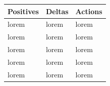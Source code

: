 \documentclass[10pt, onecolumn, draftclsnofoot, letterpaper, compsoc]{IEEEtran}
\begin{document}
\begin{table}[h]
    \centering
    \begin{tabular}{|p{.3\linewidth}|p{.3\linewidth}|p{.3\linewidth}|}

    \cline{3-3}

    \hline \textbf{Positives} & \textbf{Deltas} & \textbf{Actions} \\ \hline

    lorem & lorem & lorem \\ \hline
    lorem & lorem & lorem \\ \hline
    lorem & lorem & lorem \\ \hline
    lorem & lorem & lorem \\ \hline
    lorem & lorem & lorem \\ \hline

    \end{tabular}
\end{table}
\end{document}
